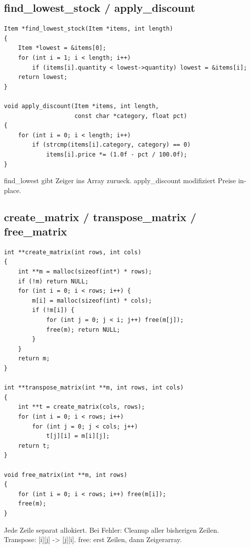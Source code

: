 \documentclass[10pt, a4paper]{article}
\begin{document}
\subsection{find\_lowest\_stock / apply\_discount}
\begin{lstlisting}
Item *find_lowest_stock(Item *items, int length)
{
    Item *lowest = &items[0];
    for (int i = 1; i < length; i++)
        if (items[i].quantity < lowest->quantity) lowest = &items[i];
    return lowest;
}

void apply_discount(Item *items, int length,
                    const char *category, float pct)
{
    for (int i = 0; i < length; i++)
        if (strcmp(items[i].category, category) == 0)
            items[i].price *= (1.0f - pct / 100.0f);
}
\end{lstlisting}
find\_lowest gibt Zeiger ins Array zurueck. apply\_discount modifiziert Preise in-place.

\subsection{create\_matrix / transpose\_matrix / free\_matrix}
\begin{lstlisting}
int **create_matrix(int rows, int cols)
{
    int **m = malloc(sizeof(int*) * rows);
    if (!m) return NULL;
    for (int i = 0; i < rows; i++) {
        m[i] = malloc(sizeof(int) * cols);
        if (!m[i]) {
            for (int j = 0; j < i; j++) free(m[j]);
            free(m); return NULL;
        }
    }
    return m;
}

int **transpose_matrix(int **m, int rows, int cols)
{
    int **t = create_matrix(cols, rows);
    for (int i = 0; i < rows; i++)
        for (int j = 0; j < cols; j++)
            t[j][i] = m[i][j];
    return t;
}

void free_matrix(int **m, int rows)
{
    for (int i = 0; i < rows; i++) free(m[i]);
    free(m);
}
\end{lstlisting}
Jede Zeile separat allokiert. Bei Fehler: Cleanup aller bisherigen Zeilen. Transpose: [i][j] -> [j][i]. free: erst Zeilen, dann Zeigerarray.
\end{document}
